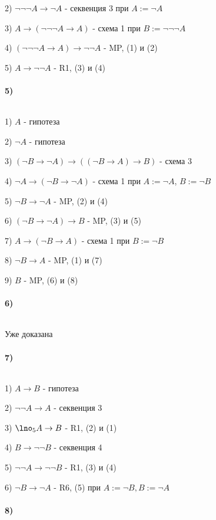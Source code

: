 \begin{myproof}
2) $\lnot\lnot\lnot A \to \lnot A$ - секвенция 3 при $A:=\lnot A$

3) $A \to (\lnot\lnot\lnot A \to A)$ - схема 1 при $B :=\lnot\lnot\lnot A$ 

4) $(\lnot\lnot\lnot A \to A) \to \lnot\lnot A$ - MP, (1) и (2)

5) $A \to \lnot\lnot A$ - R1, (3) и (4)

\paragraph*{5)} ${}$ \newline

1) $A$ - гипотеза

2)  $\lnot A$ - гипотеза

3) $(\lnot B \to \lnot A) \to ((\lnot B \to A) \to B)$ - схема 3

4) $\lnot A \to (\lnot B \to \lnot A)$ - схема 1 при $A:=\lnot A$,  $B:=\lnot B$

5)  $\lnot B \to \lnot A$ - MP, (2) и (4)

6) $(\lnot B \to \lnot A) \to B$ - MP, (3) и (5)

7) $A \to (\lnot B \to A)$ - схема 1 при $B:=\lnot B$

8)  $\lnot B \to A$ - MP, (1) и (7)

9) $B$ - MP, (6) и (8)

\paragraph*{6)} ${}$ \newline

Уже доказана

\paragraph*{7)} ${}$ \newline

1) $A \to B$ - гипотеза

2) $\lnot\lnot A \to A$ - секвенция 3

3) $\lno_5 A \to B$ - R1, (2) и (1)

4) $B \to \lnot\lnot B$ - секвенция 4

5) $\lnot\lnot A \to \lnot\lnot B$ - R1, (3) и (4)

6) $\lnot B \to \lnot A$ - R6, (5) при $A:=\lnot B, B:=\lnot A$


\paragraph*{8)} ${}$ \newline


\end{myproof}
